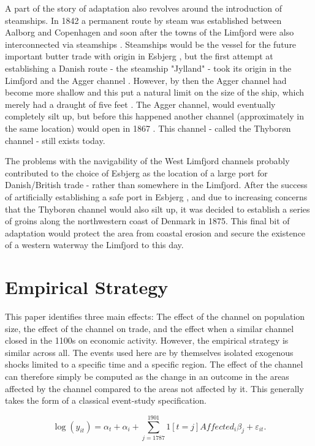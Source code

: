 \documentclass[11pt]{article}
\begin{document}
A part of the story of adaptation also revolves around the introduction of steamships. In 1842 a permanent route by steam was established between Aalborg and Copenhagen and soon after the towns of the Limfjord were also interconnected via steamships \citep{Klem1967}. Steamships would be the vessel for the future important butter trade with origin in Esbjerg \citep{Lampe2015DanesUK}, but the first attempt at establishing a Danish route - the steamship "Jylland" - took its origin in the Limfjord and the Agger channel \citep[p. 62]{Schovelin1891}. However, by then the Agger channel had become more shallow and this put a natural limit on the size of the ship, which merely had a draught of five feet \citep{Lassen1883}. The Agger channel, would eventually completely silt up, but before this happened another channel (approximately in the same location) would open in 1867 \citep{Petersen1877}. This channel - called the Thyborøn channel - still exists today.

The problems with the navigability of the West Limfjord channels probably contributed to the choice of Esbjerg as the location of a large port for Danish/British trade - rather than somewhere in the Limfjord. After the success of artificially establishing a safe port in Esbjerg \citep{Lampe2015DanesUK}, and due to increasing concerns that the Thyborøn channel would also silt up, it was decided to establish a series of groins along the northwestern coast of Denmark in 1875. This final bit of adaptation would protect the area from coastal erosion and secure the existence of a western waterway the Limfjord to this day.

\section{Empirical Strategy}
This paper identifies three main effects: The effect of the channel on population size, the effect of the channel on trade, and the effect when a similar channel closed in the 1100s on economic activity. However, the empirical strategy is similar across all. The events used here are by themselves isolated exogenous shocks limited to a specific time and a specific region. The effect of the channel can therefore simply be computed as the change in an outcome in the areas affected by the channel compared to the areas not affected by it. This generally takes the form of a classical event-study specification.

\begin{equation}
\label{eq:eq501}
\log(y_{it})= \alpha_t + \alpha_i + \sum_{j=1787}^{1901} 1[t=j]Affected_{i}\beta_{j} + \varepsilon_{it}.
\end{equation}
\end{document}
